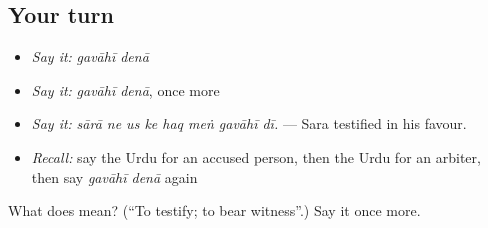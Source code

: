 \subsection*{Your turn}
\begin{itemize}
\raggedright
  \item \emph{Say it:} \emph{gavāhī denā}
  \item \emph{Say it:} \emph{gavāhī denā}, once more
  \item \emph{Say it:} \emph{sārā ne us ke haq meṅ gavāhī dī.} — Sara testified in his favour.
  \item \emph{Recall:} say the Urdu for an accused person, then the Urdu for an arbiter, then say \emph{gavāhī denā} again
\end{itemize}

\begin{tcolorbox}[breakable,colback=teal!4,colframe=teal!35!black,title={Before you move on}]
What does   mean? (\textquotedblleft{}To testify; to bear witness\textquotedblright{}.) Say it once more.
\end{tcolorbox}
